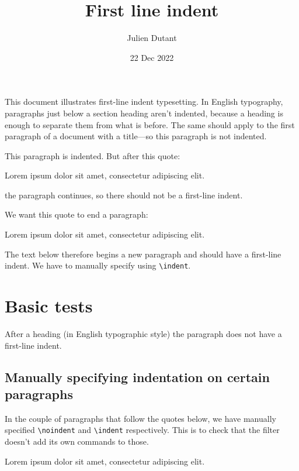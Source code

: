 \documentclass[
]{article}
\title{First line indent}
\author{Julien Dutant}
\date{22 Dec 2022}
\makeatletter
\renewenvironment{quote}
     {\list{}{\listparindent 1.5em%
              \itemindent \listparindent
              \rightmargin \leftmargin
              \parsep \z@ \@plus \p@}%
            \item\noindent\relax}
      {\endlist}
\makeatother
\begin{document}
\maketitle

\noindent This document illustrates first-line indent typesetting. In
English typography, paragraphs just below a section heading aren't
indented, because a heading is enough to separate them from what is
before. The same should apply to the first paragraph of a document with
a title---so this paragraph is not indented.

This paragraph is indented. But after this quote:

\begin{quote}
\noindent Lorem ipsum dolor sit amet, consectetur adipiscing elit.
\end{quote}

\noindent the paragraph continues, so there should not be a first-line
indent.

We want this quote to end a paragraph:

\begin{quote}
\noindent Lorem ipsum dolor sit amet, consectetur adipiscing elit.
\end{quote}

\noindent The text below therefore begins a new paragraph and should
have a first-line indent. We have to manually specify using
\texttt{\textbackslash{}indent}.

\hypertarget{basic-tests}{%
\section{Basic tests}\label{basic-tests}}

After a heading (in English typographic style) the paragraph does not
have a first-line indent.

\hypertarget{manually-specifying-indentation-on-certain-paragraphs}{%
\subsection{Manually specifying indentation on certain
paragraphs}\label{manually-specifying-indentation-on-certain-paragraphs}}

In the couple of paragraphs that follow the quotes below, we have
manually specified \texttt{\textbackslash{}noindent} and
\texttt{\textbackslash{}indent} respectively. This is to check that the
filter doesn't add its own commands to those.

\begin{quote}
\noindent Lorem ipsum dolor sit amet, consectetur adipiscing elit.
\end{quote}
\end{document}
